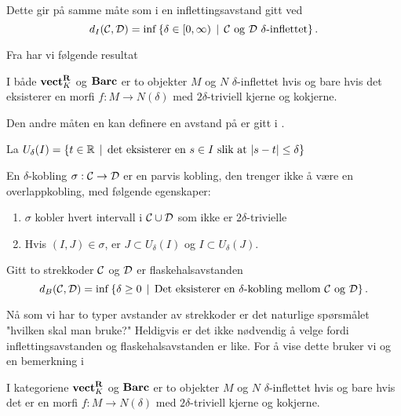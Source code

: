 Dette gir på samme måte som i  en inflettingsavstand gitt ved
\[d_I(\mathcal{C},\mathcal{D}) = \inf\left\{\delta\in[0,\infty)\,\mid\,\text{$\mathcal{C}$ og $\mathcal{D}$ $\delta$-inflettet}\right\}.\]

Fra \citep[proposisjon 4.2]{Bauer2020} har vi følgende resultat
\begin{proposisjon}\label{prop:inftriv}
  I både $\textnormal{\textbf{vect}}_K^{\textnormal{\textbf{{R}}}}$ og $\textnormal{\textbf{Barc}}$ er to objekter $M$ og $N$ $\delta$-inflettet hvis og bare hvis det eksisterer en morfi $f: M\to N(\delta)$ med $2\delta$-triviell kjerne og kokjerne.
\end{proposisjon}

Den andre måten en kan definere en avstand på er gitt
i \cite[seksjon 4.2]{Bauer2020}.

La $U_\delta(I) = \left\{t\in\mathbb{R}\,\mid\,\text{det eksisterer en $s\in I$ slik at }|s-t|\leq\delta\right\}$

\begin{definisjon}\label{def:delta-kobling}
En $\delta$-kobling $\sigma:\mathcal{C}\to \mathcal{D}$ er en parvis kobling, den trenger ikke å være en overlappkobling, med følgende egenskaper:
\begin{enumerate}
    \item $\sigma$ kobler hvert intervall i $\mathcal{C}\cup\mathcal{D}$ som ikke er $2\delta$-trivielle\\
    \item Hvis $(I,J)\in\sigma$, er $J\subset U_\delta(I)$ og $I\subset U_\delta(J)$.
\end{enumerate}
\end{definisjon}

\begin{definisjon}\label{def:FlaskAvst}
Gitt to strekkoder $\mathcal{C}$ og $\mathcal{D}$ er flaskehalsavstanden
\[d_B(\mathcal{C},\mathcal{D}) = \inf\left\{\delta\geq 0\,\mid\,\text{Det eksisterer en $\delta$-kobling mellom $\mathcal{C}$ og $\mathcal{D}$}\right\}.\]
\end{definisjon}

Nå som vi har to typer avstander av strekkoder er det
naturlige spørsmålet "hvilken skal man bruke?" Heldigvis
er det ikke nødvendig å velge fordi inflettingsavstanden
og flaskehalsavstanden er like. For å vise dette bruker vi
\citep[proposisjon 4.2]{Bauer2020} og en bemerkning
i \citep[seksjon 4.2]{Bauer2020}

\begin{proposisjon}\label{prop:Prop2.4-Bauer2020}
  I kategoriene $\textnormal{\textbf{vect}}_K^{\textnormal{\textbf{{R}}}}$ og $\textnormal{\textbf{Barc}}$ er to objekter $M$ og $N$
  $\delta$-inflettet hvis og bare hvis det er en morfi $f: M\to
  N(\delta)$ med $2\delta$-triviell kjerne og kokjerne.
\end{proposisjon}

